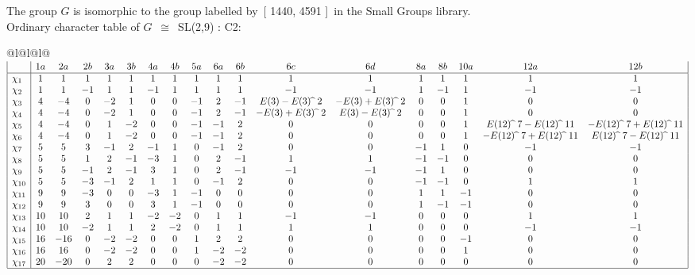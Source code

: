\documentclass[varwidth=\maxdimen,border=10]{standalone}
\begin{document}
The group $G$ is isomorphic to the group labelled by\ [ 1440, 4591 ]\ in the Small Groups library.\\
Ordinary character table of $G$\ $\cong$\ SL(2,9) : C2:\\
\begin{center}
\begin{tabular}{@{}l@{}l@{}l@{}}
\hline
\(\begin{array}{|l|ccccccccccccccccc|}
  & 1a & 2a & 2b & 3a & 3b & 4a & 4b & 5a & 6a & 6b & 6c & 6d & 8a & 8b & 10a & 12a & 12b\\ \hline
\chi_{1} & 1 & 1 & 1 & 1 & 1 & 1 & 1 & 1 & 1 & 1 & 1 & 1 & 1 & 1 & 1 & 1 & 1\\
\chi_{2} & 1 & 1 & -1 & 1 & 1 & -1 & 1 & 1 & 1 & 1 & -1 & -1 & 1 & -1 & 1 & -1 & -1\\
\chi_{3} & 4 & -4 & 0 & -2 & 1 & 0 & 0 & -1 & 2 & -1 & E(3)-E(3) \widehat{\ }\ {2} & -E(3)+E(3) \widehat{\ }\ {2} & 0 & 0 & 1 & 0 & 0\\
\chi_{4} & 4 & -4 & 0 & -2 & 1 & 0 & 0 & -1 & 2 & -1 & -E(3)+E(3) \widehat{\ }\ {2} & E(3)-E(3) \widehat{\ }\ {2} & 0 & 0 & 1 & 0 & 0\\
\chi_{5} & 4 & -4 & 0 & 1 & -2 & 0 & 0 & -1 & -1 & 2 & 0 & 0 & 0 & 0 & 1 & E(12) \widehat{\ }\ {7}-E(12) \widehat{\ }\ {11} & -E(12) \widehat{\ }\ {7}+E(12) \widehat{\ }\ {11}\\
\chi_{6} & 4 & -4 & 0 & 1 & -2 & 0 & 0 & -1 & -1 & 2 & 0 & 0 & 0 & 0 & 1 & -E(12) \widehat{\ }\ {7}+E(12) \widehat{\ }\ {11} & E(12) \widehat{\ }\ {7}-E(12) \widehat{\ }\ {11}\\
\chi_{7} & 5 & 5 & 3 & -1 & 2 & -1 & 1 & 0 & -1 & 2 & 0 & 0 & -1 & 1 & 0 & -1 & -1\\
\chi_{8} & 5 & 5 & 1 & 2 & -1 & -3 & 1 & 0 & 2 & -1 & 1 & 1 & -1 & -1 & 0 & 0 & 0\\
\chi_{9} & 5 & 5 & -1 & 2 & -1 & 3 & 1 & 0 & 2 & -1 & -1 & -1 & -1 & 1 & 0 & 0 & 0\\
\chi_{10} & 5 & 5 & -3 & -1 & 2 & 1 & 1 & 0 & -1 & 2 & 0 & 0 & -1 & -1 & 0 & 1 & 1\\
\chi_{11} & 9 & 9 & -3 & 0 & 0 & -3 & 1 & -1 & 0 & 0 & 0 & 0 & 1 & 1 & -1 & 0 & 0\\
\chi_{12} & 9 & 9 & 3 & 0 & 0 & 3 & 1 & -1 & 0 & 0 & 0 & 0 & 1 & -1 & -1 & 0 & 0\\
\chi_{13} & 10 & 10 & 2 & 1 & 1 & -2 & -2 & 0 & 1 & 1 & -1 & -1 & 0 & 0 & 0 & 1 & 1\\
\chi_{14} & 10 & 10 & -2 & 1 & 1 & 2 & -2 & 0 & 1 & 1 & 1 & 1 & 0 & 0 & 0 & -1 & -1\\
\chi_{15} & 16 & -16 & 0 & -2 & -2 & 0 & 0 & 1 & 2 & 2 & 0 & 0 & 0 & 0 & -1 & 0 & 0\\
\chi_{16} & 16 & 16 & 0 & -2 & -2 & 0 & 0 & 1 & -2 & -2 & 0 & 0 & 0 & 0 & 1 & 0 & 0\\
\chi_{17} & 20 & -20 & 0 & 2 & 2 & 0 & 0 & 0 & -2 & -2 & 0 & 0 & 0 & 0 & 0 & 0 & 0\\
\hline
\end{array}\)\\
\end{tabular}
\end{center}
\end{document}
